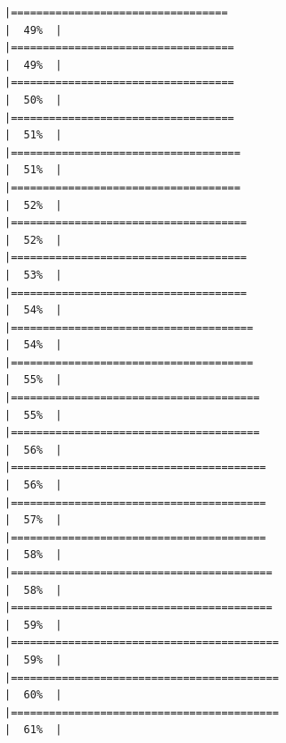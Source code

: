 \documentclass[
  bookmarksnumbered]{article}
\begin{document}
\begin{verbatim}
|==================================                                    |  49%  |                                                                              |===================================                                   |  49%  |                                                                              |===================================                                   |  50%  |                                                                              |===================================                                   |  51%  |                                                                              |====================================                                  |  51%  |                                                                              |====================================                                  |  52%  |                                                                              |=====================================                                 |  52%  |                                                                              |=====================================                                 |  53%  |                                                                              |=====================================                                 |  54%  |                                                                              |======================================                                |  54%  |                                                                              |======================================                                |  55%  |                                                                              |=======================================                               |  55%  |                                                                              |=======================================                               |  56%  |                                                                              |========================================                              |  56%  |                                                                              |========================================                              |  57%  |                                                                              |========================================                              |  58%  |                                                                              |=========================================                             |  58%  |                                                                              |=========================================                             |  59%  |                                                                              |==========================================                            |  59%  |                                                                              |==========================================                            |  60%  |                                                                              |==========================================                            |  61%  |                                                                              
\end{verbatim}
\end{document}
